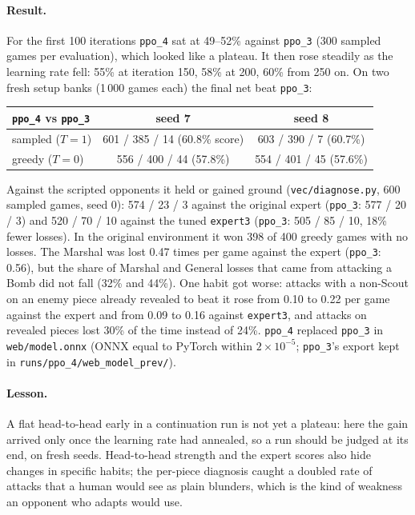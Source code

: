 \paragraph{Result.} For the first 100 iterations \texttt{ppo\_4} sat at 49--52\% against
\texttt{ppo\_3} (300 sampled games per evaluation), which looked like a plateau. It then rose
steadily as the learning rate fell: 55\% at iteration 150, 58\% at 200, 60\% from 250 on. On two
fresh setup banks (1\,000 games each) the final net beat \texttt{ppo\_3}:
\begin{center}
\small
\begin{tabular}{lcc}
\toprule
\texttt{ppo\_4} vs \texttt{ppo\_3} & seed 7 & seed 8 \\
\midrule
sampled ($T=1$) & 601 / 385 / 14 (60.8\% score) & 603 / 390 / 7 (60.7\%) \\
greedy ($T=0$)  & 556 / 400 / 44 (57.8\%)       & 554 / 401 / 45 (57.6\%) \\
\bottomrule
\end{tabular}
\end{center}
Against the scripted opponents it held or gained ground (\texttt{vec/diagnose.py}, 600 sampled
games, seed 0): 574 / 23 / 3 against the original expert (\texttt{ppo\_3}: 577 / 20 / 3) and
520 / 70 / 10 against the tuned \texttt{expert3} (\texttt{ppo\_3}: 505 / 85 / 10, 18\% fewer
losses). In the original environment it won 398 of 400 greedy games with no losses. The Marshal was
lost 0.47 times per game against the expert (\texttt{ppo\_3}: 0.56), but the share of Marshal and
General losses that came from attacking a Bomb did not fall (32\% and 44\%). One habit got worse:
attacks with a non-Scout on an enemy piece already revealed to beat it rose from 0.10 to 0.22 per
game against the expert and from 0.09 to 0.16 against \texttt{expert3}, and attacks on revealed
pieces lost 30\% of the time instead of 24\%. \texttt{ppo\_4} replaced \texttt{ppo\_3} in
\texttt{web/model.onnx} (ONNX equal to PyTorch within $2\times10^{-5}$; \texttt{ppo\_3}'s export kept
in \texttt{runs/ppo\_4/web\_model\_prev/}).

\paragraph{Lesson.} A flat head-to-head early in a continuation run is not yet a plateau: here the
gain arrived only once the learning rate had annealed, so a run should be judged at its end, on fresh
seeds. Head-to-head strength and the expert scores also hide changes in specific habits; the
per-piece diagnosis caught a doubled rate of attacks that a human would see as plain blunders, which
is the kind of weakness an opponent who adapts would use.

